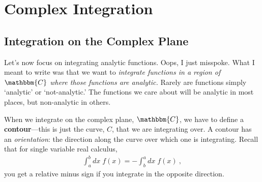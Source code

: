 \documentclass[
  11pt,
	colorful,
	raggedright,
]{tufte-style-thesis-flip}
\begin{document}
\chapter{Complex Integration}

\section{Integration on the Complex Plane}

Let's now focus on integrating analytic functions. Oops, I just misspoke. What I meant to write was that we want to \emph{integrate functions in a region of $\mathbbm{C}$ where those functions are analytic.} Rarely are functions simply `analytic' or `not-analytic.' The functions we care about will be analytic in most places, but non-analytic in others. 

When we integrate on the complex plane, $\mathbbm{C}$, we have to define a \textbf{contour}---this is just the curve, $C$, that we are integrating over. A contour has an \emph{orientation}: the direction along the curve over which one is integrating. Recall that for single variable real calculus,
\begin{align}
  \int_a^b dx\; f(x) = - \int_b^a dx\; f(x) \ ,
\end{align}
you get a relative minus sign if you integrate in the opposite direction.
\end{document}
